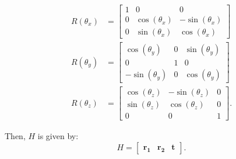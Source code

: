 \begin{align}
	R(\theta_x) & =
	\begin{bmatrix}
		1 & 0              & 0               \\
		0 & \cos(\theta_x) & -\sin(\theta_x) \\
		0 & \sin(\theta_x) & \cos(\theta_x)
	\end{bmatrix} \\
	R(\theta_y) & =
	\begin{bmatrix}
		\cos(\theta_y)  & 0 & \sin(\theta_y) \\
		0               & 1 & 0              \\
		-\sin(\theta_y) & 0 & \cos(\theta_y)
	\end{bmatrix} \\
	R(\theta_z) & =
	\begin{bmatrix}
		\cos(\theta_z) & -\sin(\theta_z) & 0 \\
		\sin(\theta_z) & \cos(\theta_z)  & 0 \\
		0              & 0               & 1
	\end{bmatrix}.
\end{align}

Then, \(H\) is given by:
\begin{equation}
	H = \begin{bmatrix}
		\mathbf{r_1} & \mathbf{r_2} & \mathbf{t}
	\end{bmatrix}.
\end{equation}

